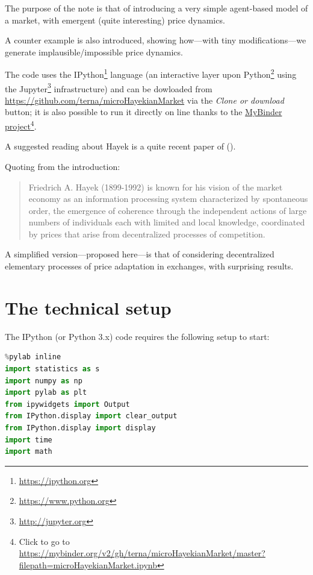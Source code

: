 \documentclass[10pt]{report}
\begin{document}
The purpose of the note is that of introducing a very simple agent-based model of a market, with emergent (quite interesting)  price dynamics.

 A counter example is also introduced, showing how---with tiny modifications---we generate implausible/impossible price dynamics.

The code uses the IPython\footnote{\url{https://ipython.org}} language (an interactive layer upon Python\footnote{\url{https://www.python.org}} using the Jupyter\footnote{\url{http://jupyter.org}} infrastructure) and can be dowloaded from \url{https://github.com/terna/microHayekianMarket} via the \emph{Clone or download} button; it is also possible to run it directly on line thanks to the \href{https://mybinder.org/v2/gh/terna/microHayekianMarket/master?filepath=microHayekianMarket.ipynb}{MyBinder project}\footnote{Click to go to \url{https://mybinder.org/v2/gh/terna/microHayekianMarket/master?filepath=microHayekianMarket.ipynb}}.

A suggested reading about Hayek is a quite recent paper of \citeauthor{10.1257/jep.31.3.215} (\citeyear{10.1257/jep.31.3.215}).

Quoting from the introduction:
\begin{quotation}
Friedrich A. Hayek (1899-1992) is known for his vision of the market economy as an information processing system characterized by spontaneous order, the emergence of coherence through the independent actions of large numbers of individuals each with limited and local knowledge, coordinated by prices that arise from decentralized processes of competition.
\end{quotation}

A simplified version---proposed here---is that of considering decentralized elementary processes of price adaptation in exchanges, with surprising results.

\section{The technical setup}\label{The technical setup}

The IPython (or Python 3.x) code requires the following setup to start:

\begin{lstlisting}[language=Python, caption=Setup of the program, basicstyle=\ttfamily\footnotesize]
%pylab inline
%pylab inline
import statistics as s
import numpy as np
import pylab as plt
from ipywidgets import Output
from IPython.display import clear_output
from IPython.display import display
import time
import math\end{lstlisting}
\end{document}
